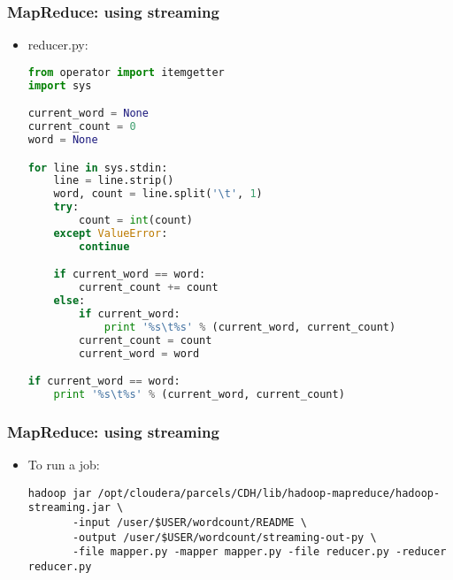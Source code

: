 \documentclass{beamer}
\begin{document}
\begin{frame}[fragile]
 \frametitle{MapReduce: using streaming}
\begin{itemize}
  \item {\color{mycolorcli}reducer.py}:
{\color{mycolorcode}
  \begin{lstlisting}[frame=single, basicstyle=\tiny,language=python]
from operator import itemgetter
import sys

current_word = None
current_count = 0
word = None

for line in sys.stdin: 
    line = line.strip()
    word, count = line.split('\t', 1)
    try:
        count = int(count)
    except ValueError:
        continue

    if current_word == word:
        current_count += count
    else:
        if current_word:
            print '%s\t%s' % (current_word, current_count)
        current_count = count
        current_word = word

if current_word == word:
    print '%s\t%s' % (current_word, current_count)
 \end{lstlisting}
}
\end{itemize}
\end{frame}

\begin{frame}[fragile]
 \frametitle{MapReduce: using streaming}

 \begin{itemize}
   \item To run a job:
{\color{mycolorcli}
  \begin{lstlisting}[frame=single, basicstyle=\tiny]
hadoop jar /opt/cloudera/parcels/CDH/lib/hadoop-mapreduce/hadoop-streaming.jar \ 
       -input /user/$USER/wordcount/README \
       -output /user/$USER/wordcount/streaming-out-py \ 
       -file mapper.py -mapper mapper.py -file reducer.py -reducer reducer.py
 \end{lstlisting}
}

 \end{itemize}


\end{frame}
\end{document}
